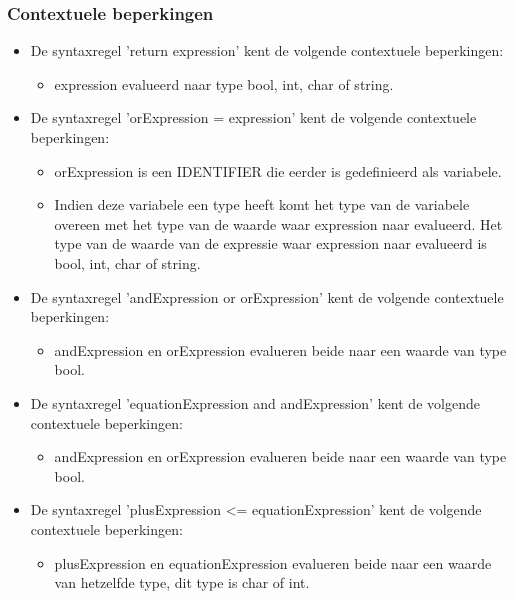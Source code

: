     \subsubsection{Contextuele beperkingen}
        \begin{itemize}
        \item De syntaxregel 'return expression' kent de volgende contextuele beperkingen:
            \begin{itemize}
            \item expression evalueerd naar type bool, int, char of string.
            \end{itemize}
        \item De syntaxregel 'orExpression = expression' kent de volgende contextuele beperkingen:
            \begin{itemize}
            \item orExpression is een IDENTIFIER die eerder is gedefinieerd als variabele.
            \item Indien deze variabele een type heeft komt het type van de variabele overeen met het type van de waarde waar expression naar evalueerd. Het type van de waarde van de expressie waar expression naar evalueerd is bool, int, char of string.
            \end{itemize}
        \item De syntaxregel 'andExpression or orExpression' kent de volgende contextuele beperkingen:
            \begin{itemize}
             \item andExpression en orExpression evalueren beide naar een waarde van type bool.
            \end{itemize}
        \item De syntaxregel 'equationExpression and andExpression' kent de volgende contextuele beperkingen:
            \begin{itemize}
            \item andExpression en orExpression evalueren beide naar een waarde van type bool.
            \end{itemize}
        \item De syntaxregel 'plusExpression \textless{}= equationExpression' kent de volgende contextuele beperkingen:
            \begin{itemize}
            \item plusExpression en equationExpression evalueren beide naar een waarde van hetzelfde type, dit type is char of int.
            \end{itemize}

\end{itemize}
